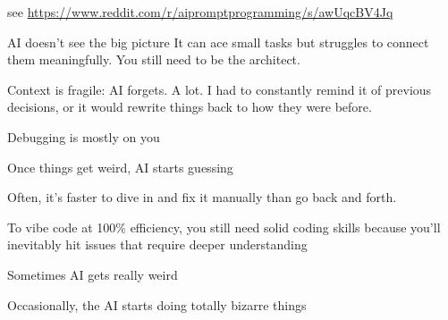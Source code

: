 \begin{frame}
    
    see \url{https://www.reddit.com/r/aipromptprogramming/s/awUqcBV4Jq}

    AI doesn't see the big picture It can ace small tasks but struggles to
    connect them meaningfully. You still need to be the architect.

    Context is fragile: AI forgets. A lot. I had to constantly remind it of
    previous decisions, or it would rewrite things back to how they were before.

    Debugging is mostly on you 

    Once things get weird, AI starts guessing

    Often, it’s faster to dive in and fix it manually than go back and forth. 

    To vibe code at 100\% efficiency, you still need solid coding skills because you’ll
    inevitably hit issues that require deeper understanding

    Sometimes AI gets really weird 

    Occasionally, the AI starts doing totally bizarre things

\end{frame}




